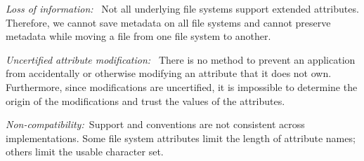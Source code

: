 \emph{Loss of information:\ } Not all underlying file systems support extended attributes. Therefore, we cannot save metadata on all file systems and cannot preserve metadata while moving a file from one file system to another.


\emph{Uncertified attribute modification:\ } There is no method to prevent an application from accidentally or otherwise modifying an attribute that it does not own. Furthermore, since modifications are uncertified, it is impossible to determine the origin of the modifications and trust the values of the attributes.

\emph{Non-compatibility:\ }Support and conventions are not consistent across implementations. Some file system attributes limit the length of attribute names; others limit the usable character set.




